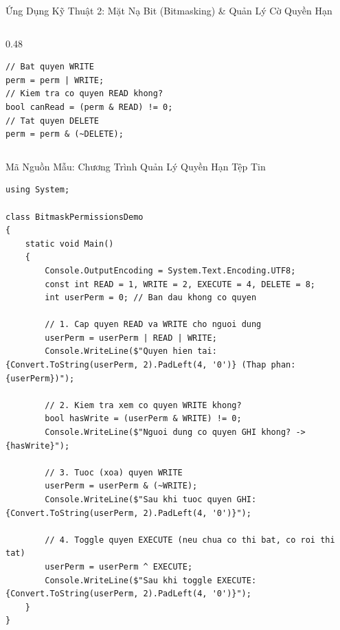 \documentclass[aspectratio=169, 10pt]{beamer}
\begin{document}
\begin{frame}[fragile]{Ứng Dụng Kỹ Thuật 2: Mặt Nạ Bit (Bitmasking) \& Quản Lý Cờ Quyền Hạn}
\begin{columns}[T]
    \begin{column}{0.48\textwidth}
      \begin{tcolorbox}[colback=CodeBg,colframe=UniNavy,title=\textbf{Cú pháp mẫu C\#},fonttitle=\scriptsize\bfseries]
\begin{lstlisting}[numbers=none]
// Bat quyen WRITE
perm = perm | WRITE;
// Kiem tra co quyen READ khong?
bool canRead = (perm & READ) != 0;
// Tat quyen DELETE
perm = perm & (~DELETE);
\end{lstlisting}
      \end{tcolorbox}
    \end{column}
  \end{columns}
\end{frame}

\begin{frame}[fragile]{Mã Nguồn Mẫu: Chương Trình Quản Lý Quyền Hạn Tệp Tin}
\begin{lstlisting}
using System;

class BitmaskPermissionsDemo
{
    static void Main()
    {
        Console.OutputEncoding = System.Text.Encoding.UTF8;
        const int READ = 1, WRITE = 2, EXECUTE = 4, DELETE = 8;
        int userPerm = 0; // Ban dau khong co quyen

        // 1. Cap quyen READ va WRITE cho nguoi dung
        userPerm = userPerm | READ | WRITE;
        Console.WriteLine($"Quyen hien tai: {Convert.ToString(userPerm, 2).PadLeft(4, '0')} (Thap phan: {userPerm})");

        // 2. Kiem tra xem co quyen WRITE khong?
        bool hasWrite = (userPerm & WRITE) != 0;
        Console.WriteLine($"Nguoi dung co quyen GHI khong? -> {hasWrite}");

        // 3. Tuoc (xoa) quyen WRITE
        userPerm = userPerm & (~WRITE);
        Console.WriteLine($"Sau khi tuoc quyen GHI: {Convert.ToString(userPerm, 2).PadLeft(4, '0')}");

        // 4. Toggle quyen EXECUTE (neu chua co thi bat, co roi thi tat)
        userPerm = userPerm ^ EXECUTE;
        Console.WriteLine($"Sau khi toggle EXECUTE: {Convert.ToString(userPerm, 2).PadLeft(4, '0')}");
    }
}
\end{lstlisting}
\end{frame}
\end{document}
